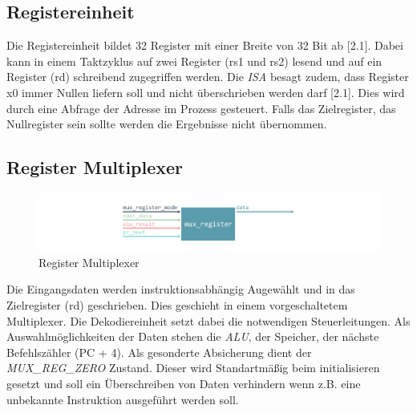         \subsection{Registereinheit} 
            Die Registereinheit bildet 32 Register mit einer Breite von 32 Bit ab \cite{riscv-isa-specs}[2.1].
            Dabei kann in einem Taktzyklus auf zwei Register (rs1 und rs2) lesend und auf ein Register (rd) schreibend zugegriffen werden.
            Die \textit{ISA} besagt zudem, dass Register x0 immer Nullen liefern soll und nicht überschrieben werden darf \cite{riscv-isa-specs}[2.1].
            Dies wird durch eine Abfrage der Adresse im Prozess gesteuert. Falls das Zielregister, das Nullregister sein sollte werden die Ergebnisse
            nicht übernommen.
            

        \subsection{Register Multiplexer}

            \begin{figure}[H]
                \centering
                \includegraphics[scale=1]{img/block_mux_register.pdf}
                \caption{Register Multiplexer}
                \label{fig:register_mux}
            \end{figure}


            Die Eingangsdaten werden instruktionsabhängig Augewählt und in das Zielregister (rd) geschrieben.
            Dies geschieht in einem vorgeschaltetem Multiplexer. Die Dekodiereinheit setzt dabei die notwendigen Steuerleitungen.
            Als Auswahlmöglichkeiten der Daten stehen die \textit{ALU}, der Speicher, der nächste Befehlszähler (PC + 4).
            Als gesonderte Absicherung dient der \textit{MUX\_REG\_ZERO} Zustand.
            Dieser wird Standartmäßig beim initialisieren gesetzt und soll ein Überschreiben von Daten verhindern wenn z.B.
            eine unbekannte Instruktion ausgeführt werden soll.
            

